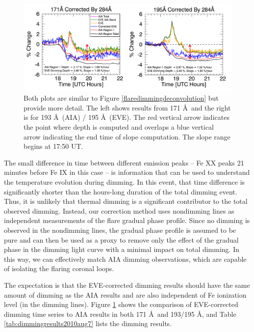 \begin{figure}[!h]
    \begin{center}
	    \includegraphics[width=166mm]{Images/EVECorrectionResults2010Aug7.png}
    \end{center}
    \caption[Dimming parameterization for 2010 August 7 event]{
        Both plots are similar to Figure \ref{flaredimmingdeconvolution} but provide more detail. The left shows results 
        from 171 \AA\ and the right is for 193 \AA\ (AIA) / 195 \AA\ (EVE). The red vertical arrow indicates the point 
        where depth is computed and overlaps a blue vertical arrow indicating the end time of slope computation. 
        The slope range begins at 17:50 UT. 
   	}
    \label{fig:parameterization2010aug7}
\end{figure}

The small difference in time between different emission peaks -- Fe XX peaks 21 minutes before Fe IX in this case -- is information that can be used to understand the temperature evolution during dimming. In this event, that time difference is significantly shorter than the hours-long duration of the total dimming event. Thus, it is unlikely that thermal dimming is a significant contributor to the total observed dimming. Instead, our correction method uses nondimming lines as independent measurements of the flare gradual phase profile. Since no dimming is observed in the nondimming lines, the gradual phase profile is assumed to be pure and can then be used as a proxy to remove only the effect of the gradual phase in the dimming light curve with a minimal impact on total dimming. In this way, we can effectively match AIA dimming observations, which are capable of isolating the flaring coronal loops.

The expectation is that the EVE-corrected dimming results should have the same amount of dimming as the AIA results and are also independent of Fe ionization level (in the dimming lines). Figure \ref{fig:parameterization2010aug7} shows the comparison of EVE-corrected dimming time series to AIA results in both 171 \AA\ and 193/195 \AA, and Table \ref{tab:dimmingresults2010aug7} lists the dimming results. 

